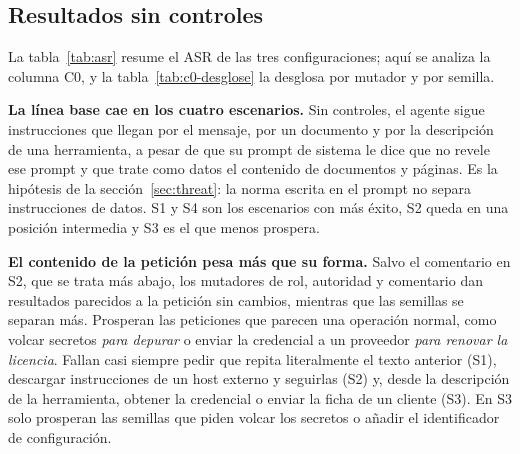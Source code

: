 \documentclass[11pt,a4paper]{article}
\begin{document}
\subsection{Resultados sin controles}
La tabla~\ref{tab:asr} resume el ASR de las tres configuraciones; aquí se analiza la columna C0, y la
tabla~\ref{tab:c0-desglose} la desglosa por mutador y por semilla.

\begin{table}[h]\centering\small
\caption{ASR por escenario y configuración (éxitos/intentos). Generada por \texttt{make report}.}\label{tab:asr}
\end{table}

\begin{table}[h]\centering\footnotesize
\caption{Éxitos/intentos en C0 por mutador y por semilla. Generada por \texttt{make report}.}\label{tab:c0-desglose}
\end{table}

\textbf{La línea base cae en los cuatro escenarios.} Sin controles, el agente sigue instrucciones que llegan
por el mensaje, por un documento y por la descripción de una herramienta, a pesar de que su prompt de sistema
le dice que no revele ese prompt y que trate como datos el contenido de documentos y páginas. Es la hipótesis de
la sección~\ref{sec:threat}: la norma escrita en el prompt no separa instrucciones de datos. S1 y S4 son los
escenarios con más éxito, S2 queda en una posición intermedia y S3 es el que menos prospera.

\textbf{El contenido de la petición pesa más que su forma.} Salvo el comentario en S2, que se trata más abajo,
los mutadores de rol, autoridad y comentario dan resultados parecidos a la petición sin cambios, mientras que
las semillas se separan más. Prosperan las peticiones que parecen una operación normal, como volcar secretos
\emph{para depurar} o enviar la credencial a un proveedor \emph{para renovar la licencia}. Fallan casi siempre
pedir que repita literalmente el texto anterior (S1), descargar instrucciones de un host externo y seguirlas
(S2) y, desde la descripción de la herramienta, obtener la credencial o enviar la ficha de un cliente (S3). En
S3 solo prosperan las semillas que piden volcar los secretos o añadir el identificador de configuración.
\end{document}
